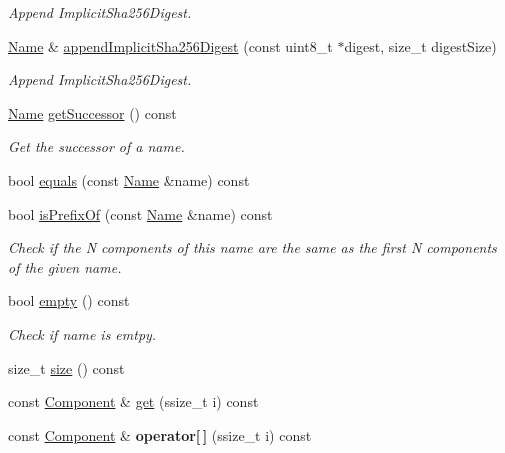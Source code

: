 \begin{DoxyCompactItemize}
\begin{DoxyCompactList}\small\item\em Append Implicit\+Sha256\+Digest. \end{DoxyCompactList}\item 
\hyperlink{classndn_1_1Name}{Name} \& \hyperlink{classndn_1_1Name_ae810549df85a1c3bc443f20b9acf4e67}{append\+Implicit\+Sha256\+Digest} (const uint8\+\_\+t $\ast$digest, size\+\_\+t digest\+Size)\hypertarget{classndn_1_1Name_ae810549df85a1c3bc443f20b9acf4e67}{}\label{classndn_1_1Name_ae810549df85a1c3bc443f20b9acf4e67}

\begin{DoxyCompactList}\small\item\em Append Implicit\+Sha256\+Digest. \end{DoxyCompactList}\item 
\hyperlink{classndn_1_1Name}{Name} \hyperlink{classndn_1_1Name_a30c2d73e14442ca04c5fa7c8c0250159}{get\+Successor} () const
\begin{DoxyCompactList}\small\item\em Get the successor of a name. \end{DoxyCompactList}\item 
bool \hyperlink{classndn_1_1Name_add6b67d57a80494caffa75be884f09ae}{equals} (const \hyperlink{classndn_1_1Name}{Name} \&name) const
\item 
bool \hyperlink{classndn_1_1Name_ac84660bb7aa3bb00133b4d0270ddbf35}{is\+Prefix\+Of} (const \hyperlink{classndn_1_1Name}{Name} \&name) const
\begin{DoxyCompactList}\small\item\em Check if the N components of this name are the same as the first N components of the given name. \end{DoxyCompactList}\item 
bool \hyperlink{classndn_1_1Name_a1f19509b799d32dd39bd9978fbb6ecf0}{empty} () const\hypertarget{classndn_1_1Name_a1f19509b799d32dd39bd9978fbb6ecf0}{}\label{classndn_1_1Name_a1f19509b799d32dd39bd9978fbb6ecf0}

\begin{DoxyCompactList}\small\item\em Check if name is emtpy. \end{DoxyCompactList}\item 
size\+\_\+t \hyperlink{classndn_1_1Name_acc6a08f38d81e4c42687ef08d98c3109}{size} () const
\item 
const \hyperlink{classndn_1_1name_1_1Component}{Component} \& \hyperlink{classndn_1_1Name_ae4eee97b5bf0df5f8f1e94159b9baa3d}{get} (ssize\+\_\+t i) const
\item 
const \hyperlink{classndn_1_1name_1_1Component}{Component} \& {\bfseries operator\mbox{[}$\,$\mbox{]}} (ssize\+\_\+t i) const\hypertarget{classndn_1_1Name_a8d4e0ef4d6587f99edc2bc791c055343}{}\label{classndn_1_1Name_a8d4e0ef4d6587f99edc2bc791c055343}


\end{DoxyCompactItemize}
